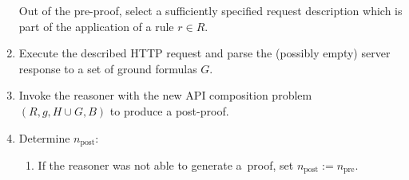 \begin{definition}
\begin{enumerate}
  Out of the pre-proof, select a sufficiently specified \http request description which is part of 
  the application of a rule $r\in R$.%
\item  Execute the described HTTP request
  and parse the (possibly empty) server response to a set of ground formulas $G$. 
\item  Invoke the reasoner with the new 
  API composition problem $(R, g, H\cup G, B)$ to produce a post-proof.
 \item  Determine $n_{\text{post}}$:
 \begin{enumerate}

 \item If the reasoner was not able to generate a~proof,
 set $n_{\text{post}}:=n_{\text{pre}}.$



\end{enumerate}
\end{enumerate}
\end{definition}
